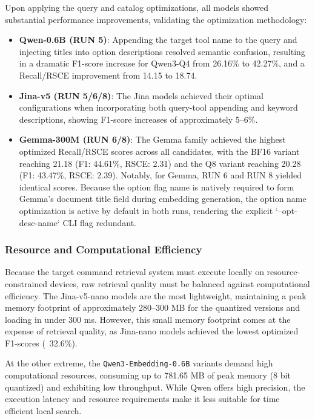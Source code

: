 Upon applying the query and catalog optimizations, all models showed substantial performance improvements, validating the optimization methodology:
\begin{itemize}
    \item \textbf{Qwen-0.6B (RUN 5)}: Appending the target tool name to the query and injecting titles into option descriptions resolved semantic confusion, resulting in a dramatic F1-score increase for Qwen3-Q4 from 26.16\% to 42.27\%, and a Recall/RSCE improvement from 14.15 to 18.74. 
    \item \textbf{Jina-v5 (RUN 5/6/8)}: The Jina models achieved their optimal configurations when incorporating both query-tool appending and keyword descriptions, showing F1-score increases of approximately 5--6\%.
    \item \textbf{Gemma-300M (RUN 6/8)}: The Gemma family achieved the highest optimized Recall/RSCE scores across all candidates, with the BF16 variant reaching 21.18 (F1: 44.61\%, RSCE: 2.31) and the Q8 variant reaching 20.28 (F1: 43.47\%, RSCE: 2.39). Notably, for Gemma, RUN 6 and RUN 8 yielded identical scores. Because the option flag name is natively required to form Gemma's document title field during embedding generation, the option name optimization is active by default in both runs, rendering the explicit `--opt-desc-name` CLI flag redundant.
\end{itemize}

\subsubsection{Resource and Computational Efficiency}

Because the target command retrieval system must execute locally on resource-constrained devices, raw retrieval quality must be balanced against computational efficiency. 
The Jina-v5-nano models are the most lightweight, maintaining a peak memory footprint of approximately 280--300 MB for the quantized versions and loading in under 300 ms. However, this small memory footprint comes at the expense of retrieval quality, as Jina-nano models achieved the lowest optimized F1-scores (~32.6\%). 

At the other extreme, the \texttt{Qwen3-Embedding-0.6B} variants demand high computational resources, consuming up to 781.65 MB of peak memory (8 bit quantized) and exhibiting low throughput. While Qwen offers high precision, the execution latency and resource requirements make it less suitable for time efficient local search.

